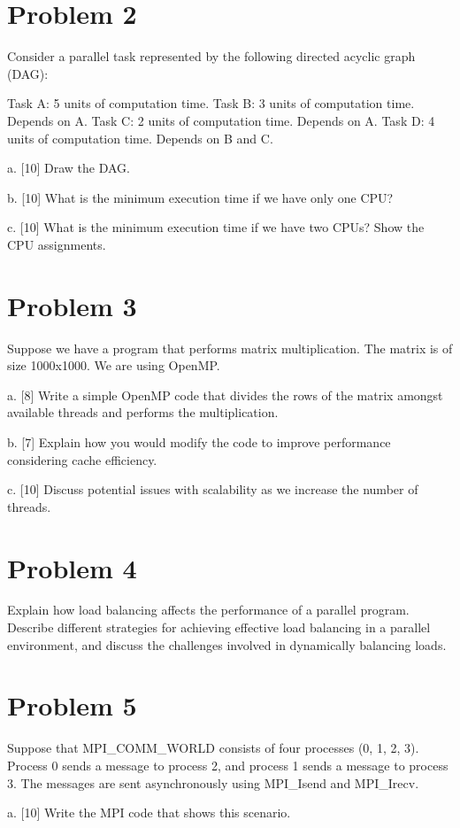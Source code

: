 \documentclass{article}
\begin{document}
\section*{Problem 2}
Consider a parallel task represented by the following directed acyclic graph (DAG):

Task A: 5 units of computation time.
Task B: 3 units of computation time. Depends on A.
Task C: 2 units of computation time. Depends on A.
Task D: 4 units of computation time. Depends on B and C.


a. [10] Draw the DAG.

b. [10] What is the minimum execution time if we have only one CPU?

c. [10] What is the minimum execution time if we have two CPUs?  Show the CPU assignments.


\section*{Problem 3}
Suppose we have a program that performs matrix multiplication. The matrix is of size 1000x1000. We are using OpenMP.

a. [8] Write a simple OpenMP code that divides the rows of the matrix amongst available threads and performs the multiplication.

b. [7] Explain how you would modify the code to improve performance considering cache efficiency.

c. [10] Discuss potential issues with scalability as we increase the number of threads.

\section*{Problem 4}
Explain how load balancing affects the performance of a parallel program. Describe different strategies for achieving effective load balancing in a parallel environment, and discuss the challenges involved in dynamically balancing loads.


\section*{Problem 5}
Suppose that MPI\_COMM\_WORLD consists of four processes (0, 1, 2, 3). Process 0 sends a message to process 2, and process 1 sends a message to process 3.  The messages are sent asynchronously using MPI\_Isend and MPI\_Irecv.

a. [10] Write the MPI code that shows this scenario.
\end{document}
